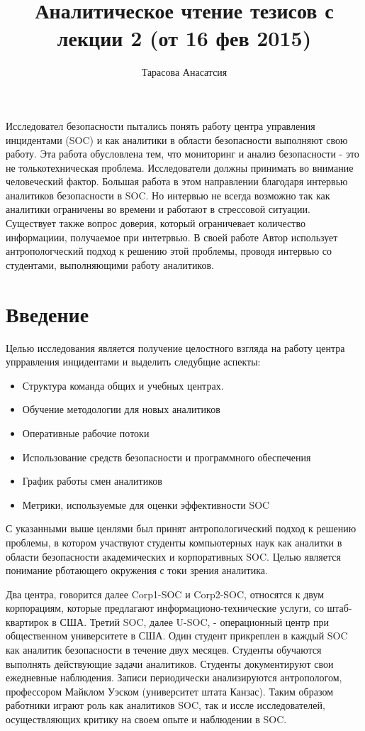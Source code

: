 \documentclass[12pt,]{article}
\author{Тарасова Анасатсия}
\title{Аналитическое чтение тезисов с лекции 2 (от 16 фев 2015)}
\begin{document}
\maketitle
Исследовател безопасности пытались понять работу центра управления инцидентами (SOC) и как  аналитики в области безопасности выполняют свою работу. Эта работа обусловлена тем, что мониторинг и анализ безопасности - это не толькотехническая проблема. Исследователи должны принимать во внимание человеческий фактор. Большая работа в этом направлении благодаря интервью аналитиков безопасности в SOC. Но интервью не всегда возможно так как аналитики ограничены во времени и работают в стрессовой ситуации. Существует также вопрос доверия, который ограничевает количество информациии, получаемое при интетрвью. В своей работе Автор использует антропологческий подход к решению этой проблемы, проводя интервью со студентами, выполняющими работу аналитиков.
\section{Введение}
Целью исследования является получение целостного взгляда на работу центра упрравления инцидентами и  выделить следубщие аспекты:
\begin{itemize}
\item Структура команда общих и учебных центрах.
\item Обучение методологии для новых аналитиков
\item Оперативные рабочие потоки
\item Использование средств безопасности и программного обеспечения
\item График работы смен аналитиков
\item Метрики, используемые для оценки эффективности SOC
\end{itemize}
С указанными выше ценлями был принят антропологический подход к решению проблемы, в котором участвуют студенты компьютерных наук как аналитки в области безопасности академических и корпоративных SOC. Целью является понимание рботающего окружения с токи зрения аналитика.

Два центра, говорится далее Corp1-SOC и Corp2-SOC, относятся к двум корпорациям, которые предлагают информационо-технические услуги, со штаб-квартирок в США. Третий SOC,  далее U-SOC, - операционный центр при общественном университете в США. Один студент прикреплен в каждый SOC как аналитик безопасности в течение двух месяцев. Студенты обучаются выполнять действующие задачи аналитиков. Студенты документируют свои ежедневные наблюдения. Записи периодически анализируются антропологом, профессором Майклом Уэском (университет штата Канзас). Таким образом работники играют роль как аналитиков SOC, так и иссле исследователей, осуществляющих критику на своем опыте и наблюдении в SOC.
\end{document}
